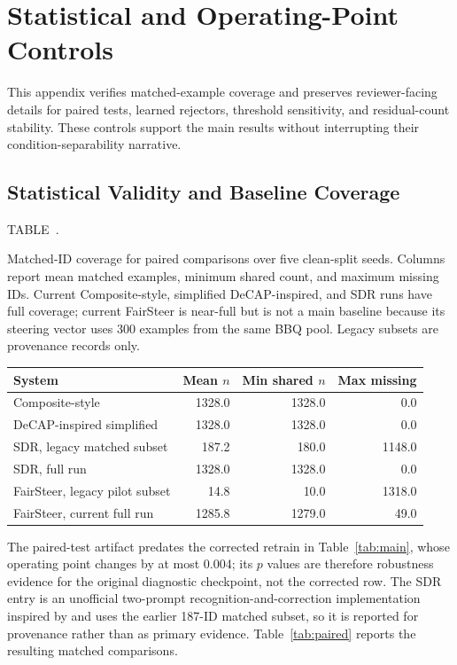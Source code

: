 \documentclass{ieeeaccess}
\newcommand{\inlinetablecaption}[2]{%
  \par\vspace{0.62\baselineskip}\noindent
  \refstepcounter{table}\label{#1}%
  {\color{accessblue}\tablecapheadfont TABLE~\thetable.\ }%
  {\tablecapfont #2\par}%
  \vspace{6pt}%
}
\begin{document}
\FloatBarrier
\appendices
\section{Statistical and Operating-Point Controls}
\label{app:statistical_controls}
This appendix verifies matched-example coverage and preserves reviewer-facing details for paired tests, learned rejectors, threshold sensitivity, and residual-count stability. These controls support the main results without interrupting their condition-separability narrative.

\subsection{Statistical Validity and Baseline Coverage}
\label{app:coverage}
\noindent\begin{minipage}{\columnwidth}
\inlinetablecaption{tab:coverage}{Matched-ID coverage for paired comparisons over five clean-split seeds. Columns report mean matched examples, minimum shared count, and maximum missing IDs. Current Composite-style, simplified DeCAP-inspired, and SDR runs have full coverage; current FairSteer is near-full but is not a main baseline because its steering vector uses 300 examples from the same BBQ pool. Legacy subsets are provenance records only.}
\begin{center}
\scriptsize
\setlength{\tabcolsep}{2pt}
\begin{tabular}{@{}lrrr@{}}
\toprule
System & Mean $n$ & Min shared $n$ & Max missing \\
\midrule
Composite-style & 1328.0 & 1328.0 & 0.0 \\
DeCAP-inspired simplified & 1328.0 & 1328.0 & 0.0 \\
SDR, legacy matched subset & 187.2 & 180.0 & 1148.0 \\
SDR, full run & 1328.0 & 1328.0 & 0.0 \\
FairSteer, legacy pilot subset & 14.8 & 10.0 & 1318.0 \\
FairSteer, current full run & 1285.8 & 1279.0 & 49.0 \\
\bottomrule
\end{tabular}
\end{center}
\end{minipage}
\par\vspace{0.5\baselineskip}

The paired-test artifact predates the corrected retrain in Table~\ref{tab:main}, whose operating point changes by at most 0.004; its $p$ values are therefore robustness evidence for the original diagnostic checkpoint, not the corrected row. The SDR entry is an unofficial two-prompt recognition-and-correction implementation inspired by \cite{gallegos2024selfdebiasing} and uses the earlier 187-ID matched subset, so it is reported for provenance rather than as primary evidence.
Table~\ref{tab:paired} reports the resulting matched comparisons.
\end{document}
